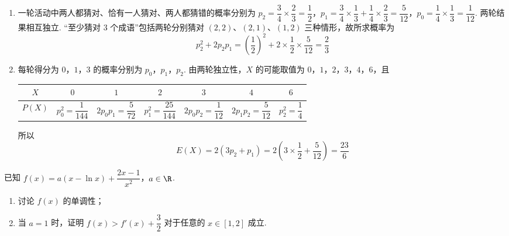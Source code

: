 \begin{solution}
\begin{enumerate}
\item 一轮活动中两人都猜对、恰有一人猜对、两人都猜错的概率分别为
\(p_2=\dfrac34\times\dfrac23=\dfrac12\)，\(p_1=\dfrac34\times\dfrac13+\dfrac14\times\dfrac23=\dfrac5{12}\)，\(p_0=\dfrac14\times\dfrac13=\dfrac1{12}\).
两轮结果相互独立. “至少猜对 \(3\) 个成语”包括两轮分别猜对 \((2,2)\)、\((2,1)\)、\((1,2)\) 三种情形，故所求概率为
\[
p_2^2+2p_2p_1=\left(\frac12\right)^2+2\times\frac12\times\frac5{12}=\frac23
\]
\item 每轮得分为 \(0\)，\(1\)，\(3\) 的概率分别为 \(p_0\)，\(p_1\)，\(p_2\). 由两轮独立性，\(X\) 的可能取值为 \(0\)，\(1\)，\(2\)，\(3\)，\(4\)，\(6\)，且
\begin{center}
\begin{tabular}{c|cccccc}
 \(X\)&\(0\)&\(1\)&\(2\)&\(3\)&\(4\)&\(6\)\\
\hline
\(P(X)\)&\(p_0^2=\dfrac1{144}\)&\(2p_0p_1=\dfrac5{72}\)&\(p_1^2=\dfrac{25}{144}\)&\(2p_0p_2=\dfrac1{12}\)&\(2p_1p_2=\dfrac5{12}\)&\(p_2^2=\dfrac14\)
\end{tabular}
\end{center}
所以
\[
E(X)=2\left(3p_2+p_1\right)=2\left(3\times\frac12+\frac5{12}\right)=\frac{23}{6}
\]
\end{enumerate}
\end{solution}

\begin{problem}
已知 \(f(x)=a\left(x-\ln x\right)+\dfrac{2x-1}{x^2}\)，\(a\in\R\).
\begin{enumerate}
\item 讨论 \(f(x)\) 的单调性；
\item 当 \(a=1\) 时，证明 \(f(x)>f'(x)+\dfrac32\) 对于任意的 \(x\in[1,2]\) 成立.
\end{enumerate}
\end{problem}

